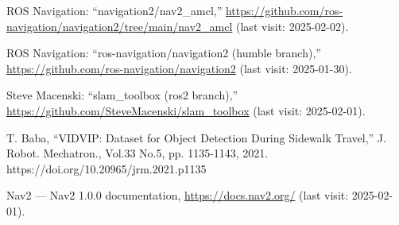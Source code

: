 \documentclass[twocolumn,9pt]{jsproceedings}
\begin{document}
\begin{thebibliography}{99}
  
  ROS Navigation: ``navigation2/nav2\_amcl,'' \url{https://github.com/ros-navigation/navigation2/tree/main/nav2_amcl}  (last visit: 2025-02-02).

  ROS Navigation: ``ros-navigation/navigation2 (humble branch),'' \url{https://github.com/ros-navigation/navigation2} (last visit: 2025-01-30).

  Steve Macenski: ``slam\_toolbox (ros2 branch),'' \url{https://github.com/SteveMacenski/slam_toolbox} (last visit: 2025-02-01).





  
  T. Baba, “VIDVIP: Dataset for Object Detection During Sidewalk Travel,” J. Robot. Mechatron., Vol.33 No.5, pp. 1135-1143, 2021. https://doi.org/10.20965/jrm.2021.p1135
  
  Nav2 — Nav2 1.0.0 documentation, \url{https://docs.nav2.org/} (last visit: 2025-02-01).
\end{thebibliography}
\normalsize
\end{document}
